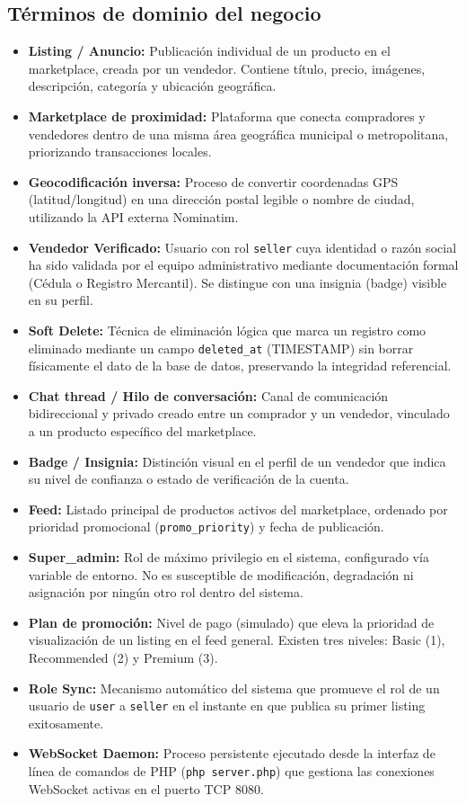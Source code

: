 \documentclass[11pt,a4paper]{report}
\begin{document}
\subsection{Términos de dominio del negocio}
\begin{itemize}
    \item \textbf{Listing / Anuncio:} Publicación individual de un producto en el marketplace, creada por un vendedor. Contiene título, precio, imágenes, descripción, categoría y ubicación geográfica.
    \item \textbf{Marketplace de proximidad:} Plataforma que conecta compradores y vendedores dentro de una misma área geográfica municipal o metropolitana, priorizando transacciones locales.
    \item \textbf{Geocodificación inversa:} Proceso de convertir coordenadas GPS (latitud/longitud) en una dirección postal legible o nombre de ciudad, utilizando la API externa Nominatim.
    \item \textbf{Vendedor Verificado:} Usuario con rol \texttt{seller} cuya identidad o razón social ha sido validada por el equipo administrativo mediante documentación formal (Cédula o Registro Mercantil). Se distingue con una insignia (badge) visible en su perfil.
    \item \textbf{Soft Delete:} Técnica de eliminación lógica que marca un registro como eliminado mediante un campo \texttt{deleted\_at} (TIMESTAMP) sin borrar físicamente el dato de la base de datos, preservando la integridad referencial.
    \item \textbf{Chat thread / Hilo de conversación:} Canal de comunicación bidireccional y privado creado entre un comprador y un vendedor, vinculado a un producto específico del marketplace.
    \item \textbf{Badge / Insignia:} Distinción visual en el perfil de un vendedor que indica su nivel de confianza o estado de verificación de la cuenta.
    \item \textbf{Feed:} Listado principal de productos activos del marketplace, ordenado por prioridad promocional (\texttt{promo\_priority}) y fecha de publicación.
    \item \textbf{Super\_admin:} Rol de máximo privilegio en el sistema, configurado vía variable de entorno. No es susceptible de modificación, degradación ni asignación por ningún otro rol dentro del sistema.
    \item \textbf{Plan de promoción:} Nivel de pago (simulado) que eleva la prioridad de visualización de un listing en el feed general. Existen tres niveles: Basic (1), Recommended (2) y Premium (3).
    \item \textbf{Role Sync:} Mecanismo automático del sistema que promueve el rol de un usuario de \texttt{user} a \texttt{seller} en el instante en que publica su primer listing exitosamente.
    \item \textbf{WebSocket Daemon:} Proceso persistente ejecutado desde la interfaz de línea de comandos de PHP (\texttt{php server.php}) que gestiona las conexiones WebSocket activas en el puerto TCP 8080.
\end{itemize}
\end{document}
